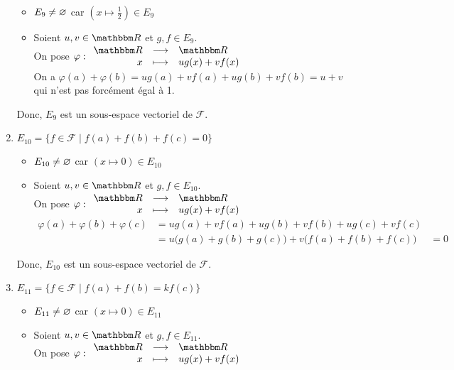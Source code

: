 \begin{enumerate}
		\begin{itemize}
			\item $E_9 \neq \varnothing$ car $\left(x\mapsto \frac{1}{2}\right) \in E_9$ 
			\item Soient  $u,v \in \R$ et $g, f \in E_9$.\\
				On pose $\varphi : \begin{array}{rcl}
					\R &\longrightarrow& \R \\
					x &\longmapsto& ug(x) + vf(x)
				\end{array}$\\
				On a $\varphi(a) + \varphi(b) = ug(a) + vf(a) + ug(b) + vf(b) = u + v$ qui n'est pas forcément égal à 1.
		\end{itemize}
		Donc, $E_9$ est un sous-espace vectoriel de $\mathcal{F}$.
	\item $E_{10} = \{f \in \mathcal{F} \mid f(a) + f(b) + f(c) = 0\}$
		\begin{itemize}
			\item $E_{10} \neq \varnothing$ car $\left(x\mapsto 0\right) \in E_{10}$ 
			\item Soient  $u,v \in \R$ et $g, f \in E_{10}$.\\
				On pose $\varphi : \begin{array}{rcl}
					\R &\longrightarrow& \R \\
					x &\longmapsto& ug(x) + vf(x)
				\end{array}$\\
				\begin{align*}
					\varphi(a) + \varphi(b) + \varphi(c) &= ug(a) + vf(a) + ug(b) + vf(b) + ug(c) + vf(c)\\
					&= u\big(g(a) + g(b) + g(c)\big) + v\big(f(a) + f(b) + f(c)\big) 
					&= 0
				\end{align*}
		\end{itemize}
		Donc, $E_{10}$ est un sous-espace vectoriel de $\mathcal{F}$.
	\item $E_{11} = \{f \in \mathcal{F} \mid f(a) + f(b) = kf(c)\}$
		\begin{itemize}
			\item $E_{11} \neq \varnothing$ car $\left(x\mapsto 0\right) \in E_{11}$ 
			\item Soient  $u,v \in \R$ et $g, f \in E_{11}$.\\
				On pose $\varphi : \begin{array}{rcl}
					\R &\longrightarrow& \R \\
					x &\longmapsto& ug(x) + vf(x)
				\end{array}$\\

\end{itemize}
\end{enumerate}
